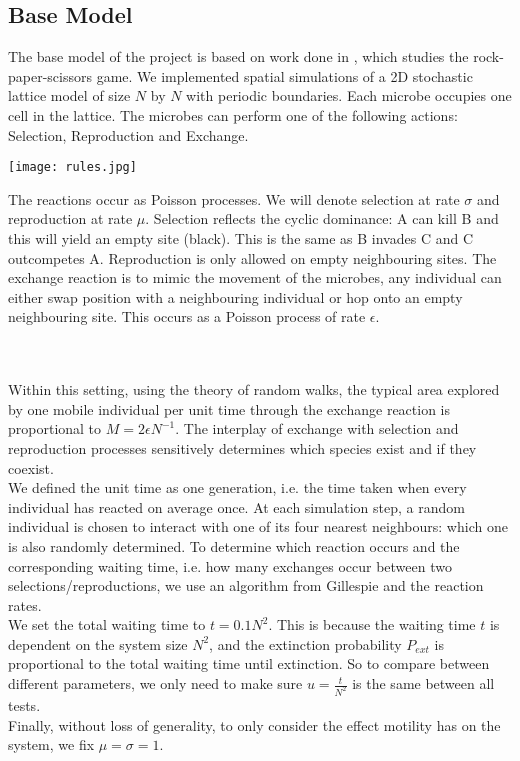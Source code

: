 \documentclass[11pt]{article}
\begin{document}
\subsection{Base Model}
The base model of the project is based on work done in \cite{rps}, which studies the rock-paper-scissors game\cite{game}. We implemented spatial simulations of a 2D stochastic lattice model of size $N$ by $N$ with periodic boundaries. Each microbe occupies one cell in the lattice. The microbes can perform one of the following actions: Selection, Reproduction and Exchange.\\
\begin{minipage}{0.5\textwidth}
\texttt{[image: rules.jpg]}
\end{minipage}
\begin{minipage}{0.5\textwidth}
The reactions occur as Poisson processes. We will denote selection at rate $\sigma$ and reproduction at rate $\mu$. Selection reflects the cyclic dominance: A can kill B and this will yield an empty site (black). This is the same as B invades C and C outcompetes A. Reproduction is only allowed on empty neighbouring sites. The exchange reaction is to mimic the movement of the microbes, any individual can either swap position with a neighbouring individual or hop onto an empty neighbouring site. This occurs as a Poisson process of rate $\epsilon$.
\end{minipage}\\\\
Within this setting, using the theory of random walks\cite{rw}, the typical area explored by one mobile individual per unit time through the exchange reaction is proportional to $M=2\epsilon N^{-1}$. The interplay of exchange with selection and reproduction processes sensitively determines which species exist and if they coexist.\\
We defined the unit time as one generation, i.e. the time taken when every individual has reacted on average once. At each simulation step, a random individual is chosen to interact with one of its four nearest neighbours: which one is also randomly determined. To determine which reaction occurs and the corresponding waiting time, i.e. how many exchanges occur between two selections/reproductions, we use an algorithm from Gillespie\cite{alg} and the reaction rates.\\
We set the total waiting time to $t=0.1N^2$. This is because the waiting time $t$ is dependent on the system size $N^2$, and the extinction probability $P_{ext}$ is proportional to the total waiting time until extinction. So to compare between different parameters, we only need to make sure $u=\frac{t}{N^2}$ is the same between all tests\cite{time}.\\
Finally, without loss of generality, to only consider the effect motility has on the system, we fix $\mu=\sigma=1$.
\end{document}

